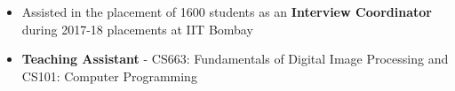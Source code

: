 \documentclass[a4paper,10pt]{article}
\begin{document}
\begin{itemize}
  \item Assisted in the placement of 1600 students as an \textbf{Interview Coordinator} during 2017-18 placements at IIT Bombay
  \\[-0.6cm]
    \item \textbf{Teaching Assistant} -  CS663: Fundamentals of Digital Image Processing and CS101: Computer Programming 
\end{itemize}
\end{document}
